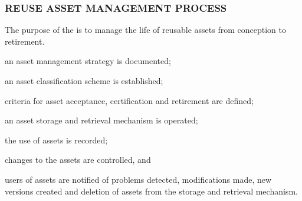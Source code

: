 		\newpage
		\subsubsection{REUSE ASSET MANAGEMENT PROCESS\label{proc:reuse_asset_management_process}}

			\begin{adjustwidth}{2em}{0pt} 

				The purpose of the  is to manage the life of reusable assets from conception to retirement.

			\end{adjustwidth}

			\begin{adjustwidth}{2em}{0pt} 

				\begin{compactitem}

					\item an asset management strategy is documented;

					\item an asset classification scheme is established;

					\item criteria for asset acceptance, certification and retirement are defined;

					\item an asset storage and retrieval mechanism is operated;

					\item the use of assets is recorded;

					\item changes to the assets are controlled, and

					\item users of assets are notified of problems detected, modifications made, new versions created and deletion of assets from the storage and retrieval mechanism.

				\end{compactitem}

			\end{adjustwidth}


